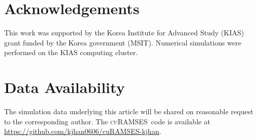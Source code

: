 \documentclass[fleqn,usenatbib]{mnras}
\newcommand{\curamses}{\textsc{cuRAMSES}}
\begin{document}
\section*{Acknowledgements}

This work was supported by the Korea Institute for Advanced Study
(KIAS) grant funded by the Korea government (MSIT).  Numerical
simulations were performed on the KIAS computing cluster.

\section*{Data Availability}

The simulation data underlying this article will be shared on
reasonable request to the corresponding author.  The \curamses\ code
is available at
\url{https://github.com/kjhan0606/cuRAMSES-kjhan}.


\end{document}
